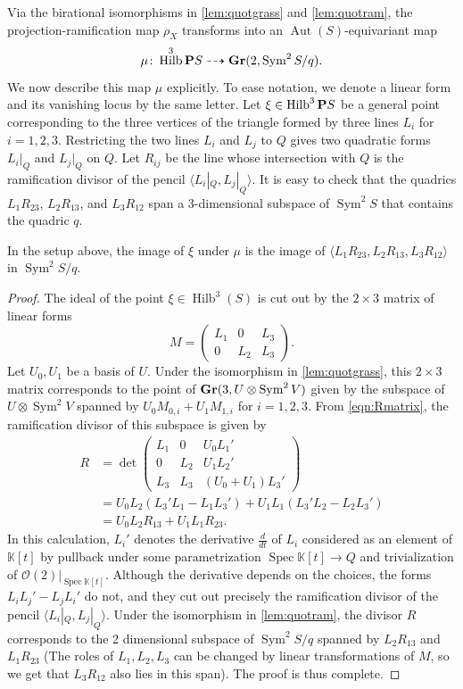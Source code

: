 \documentclass{amsart}
\renewcommand {\P}{{\bf P}}
\providecommand {\Gr}{{\bf Gr}}
\providecommand {\from}{{\colon}}
\providecommand{\spec}{\operatorname{Spec}}
\providecommand{\Aut}{\operatorname{Aut}}
\providecommand{\Sym}{\operatorname{Sym}}
\numberwithin{equation}{section}
\renewcommand{\k}{\mathbb{K}}
\DeclareMathOperator{\Hilb}{Hilb}
\renewcommand{\O}{\mathcal O}
\begin{document}
Via the birational isomorphisms in \autoref{lem:quotgrass} and \autoref{lem:quotram}, the projection-ramification map $\rho_X$ transforms into an $\Aut(S)$-equivariant map
\[
  \mu \from \Hilb^3\P S \dashrightarrow \Gr(2, \Sym^2S/q).
\]
We now describe this map $\mu$ explicitly.
To ease notation, we denote a linear form and its vanishing locus by the same letter.
Let $\xi \in \Hilb^3 \P S$ be a general point corresponding to the three vertices of the triangle formed by three lines $L_i$ for $i = 1, 2, 3$.
Restricting the two lines $L_i$ and $L_j$ to $Q$ gives two quadratic forms $L_i|_Q$ and $L_j|_Q$ on $Q$.
Let $R_{ij}$ be the line whose intersection with $Q$ is the ramification divisor of the pencil $\langle  L_i|_Q, L_j|_Q \rangle$.
It is easy to check that the quadrics $L_1 R_{23}$, $L_2 R_{13}$, and $L_3R_{12}$ span a 3-dimensional subspace of $\Sym^2 S$ that contains the quadric $q$.
\begin{lemma}\label{lem:mu}
  In the setup above, the image of $\xi$ under $\mu$ is the image of $\langle  L_1R_{23}, L_2R_{13},L_3R_{12} \rangle$ in $\Sym^2S/q$.
\end{lemma}
\begin{proof}
  The ideal of the point $\xi \in \Hilb^3(S)$ is cut out by the $2 \times 3$ matrix of linear forms
  \[
    M =
    \begin{pmatrix}
      L_1 & 0 & L_3 \\
      0 & L_2 & L_3
    \end{pmatrix}.
  \]
  Let $U_0, U_1$ be a basis of $U$.
  Under the isomorphism in \autoref{lem:quotgrass}, this $2 \times 3$ matrix corresponds to the point of $\Gr(3, U \otimes \Sym^2 V)$ given by the subspace of $U \otimes \Sym^2 V$ spanned by $U_0 M_{0,i} + U_1 M_{1,i}$ for $i = 1, 2, 3$.
  From \eqref{eqn:Rmatrix}, the ramification divisor of this subspace is given by
  \begin{align*}
    R &= \det
    \begin{pmatrix}
      L_1 & 0 & U_0 L_1' \\
      0 & L_2 & U_1 L_2' \\
      L_3 & L_3 & (U_0+U_1)L_3'
    \end{pmatrix} \\
      &= U_0L_2(L_3'L_1 - L_1L_3') + U_1L_1(L_3'L_2-L_2L_3')\\
      &= U_0L_2R_{13} + U_1 L_1R_{23}.
  \end{align*}
  In this calculation, $L_i'$ denotes the derivative $\frac{d}{dt}$ of $L_i$ considered as an element of $\k[t]$ by pullback under some parametrization $\spec \k[t] \to Q$ and trivialization of $\O(2)|_{\spec \k[t]}$.
  Although the derivative depends on the choices, the forms $L_iL_j' - L_jL_i'$ do not, and they cut out precisely the ramification divisor of the pencil $\langle  L_i|_Q, L_j|_Q \rangle$.
  Under the isomorphism in \eqref{lem:quotram}, the divisor $R$ corresponds to the 2 dimensional subspace of $\Sym^2 S/q$ spanned by $L_2R_{13}$ and $L_1R_{23}$ (The roles of $L_1, L_2, L_3$ can be changed by linear transformations of $M$, so we get that $L_3R_{12}$ also lies in this span).
  The proof is thus complete.
\end{proof}
\end{document}

